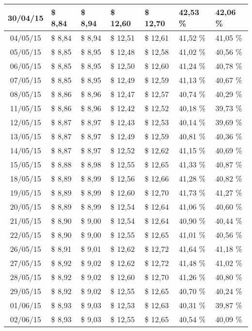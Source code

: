 \begin{center}
\begin{longtable}{|c|p{1.5cm}|p{1.5cm}|p{1.5cm}|p{1.5cm}|p{1.5cm}|p{1.5cm}|}
30/04/15 & \$ 8,84 & \$ 8,94 & \$ 12,60 & \$ 12,70 & 42,53 \% & 42,06 \% \\ \hline
04/05/15 & \$ 8,84 & \$ 8,94 & \$ 12,51 & \$ 12,61 & 41,52 \% & 41,05 \% \\ \hline
05/05/15 & \$ 8,85 & \$ 8,95 & \$ 12,48 & \$ 12,58 & 41,02 \% & 40,56 \% \\ \hline
06/05/15 & \$ 8,85 & \$ 8,95 & \$ 12,50 & \$ 12,60 & 41,24 \% & 40,78 \% \\ \hline
07/05/15 & \$ 8,85 & \$ 8,95 & \$ 12,49 & \$ 12,59 & 41,13 \% & 40,67 \% \\ \hline
08/05/15 & \$ 8,86 & \$ 8,96 & \$ 12,47 & \$ 12,57 & 40,74 \% & 40,29 \% \\ \hline
11/05/15 & \$ 8,86 & \$ 8,96 & \$ 12,42 & \$ 12,52 & 40,18 \% & 39,73 \% \\ \hline
12/05/15 & \$ 8,87 & \$ 8,97 & \$ 12,43 & \$ 12,53 & 40,14 \% & 39,69 \% \\ \hline
13/05/15 & \$ 8,87 & \$ 8,97 & \$ 12,49 & \$ 12,59 & 40,81 \% & 40,36 \% \\ \hline
14/05/15 & \$ 8,87 & \$ 8,97 & \$ 12,52 & \$ 12,62 & 41,15 \% & 40,69 \% \\ \hline
15/05/15 & \$ 8,88 & \$ 8,98 & \$ 12,55 & \$ 12,65 & 41,33 \% & 40,87 \% \\ \hline
18/05/15 & \$ 8,89 & \$ 8,99 & \$ 12,56 & \$ 12,66 & 41,28 \% & 40,82 \% \\ \hline
19/05/15 & \$ 8,89 & \$ 8,99 & \$ 12,60 & \$ 12,70 & 41,73 \% & 41,27 \% \\ \hline
20/05/15 & \$ 8,89 & \$ 8,99 & \$ 12,54 & \$ 12,64 & 41,06 \% & 40,60 \% \\ \hline
21/05/15 & \$ 8,90 & \$ 9,00 & \$ 12,54 & \$ 12,64 & 40,90 \% & 40,44 \% \\ \hline
22/05/15 & \$ 8,90 & \$ 9,00 & \$ 12,55 & \$ 12,65 & 41,01 \% & 40,56 \% \\ \hline
26/05/15 & \$ 8,91 & \$ 9,01 & \$ 12,62 & \$ 12,72 & 41,64 \% & 41,18 \% \\ \hline
27/05/15 & \$ 8,92 & \$ 9,02 & \$ 12,62 & \$ 12,72 & 41,48 \% & 41,02 \% \\ \hline
28/05/15 & \$ 8,92 & \$ 9,02 & \$ 12,60 & \$ 12,70 & 41,26 \% & 40,80 \% \\ \hline
29/05/15 & \$ 8,92 & \$ 9,02 & \$ 12,55 & \$ 12,65 & 40,70 \% & 40,24 \% \\ \hline
01/06/15 & \$ 8,93 & \$ 9,03 & \$ 12,53 & \$ 12,63 & 40,31 \% & 39,87 \% \\ \hline
02/06/15 & \$ 8,93 & \$ 9,03 & \$ 12,55 & \$ 12,65 & 40,54 \% & 40,09 \% \\ \hline

\end{longtable}
\end{center}
